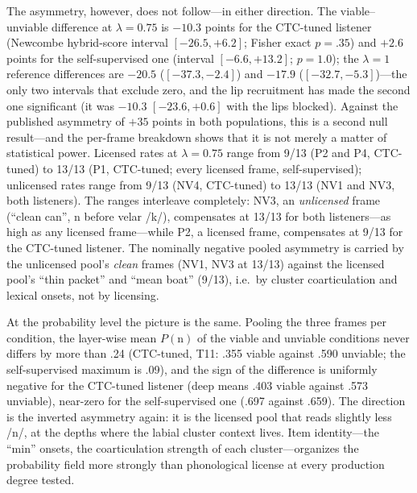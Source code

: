 \documentclass[11pt,a4paper]{article}
\newcommand{\lam}{\lambda}
\begin{document}
The asymmetry, however, does not follow---in either direction.
The viable--unviable difference at $\lam=0.75$ is $-10.3$ points for
the CTC-tuned listener (Newcombe hybrid-score interval $[-26.5,
+6.2]$; Fisher exact $p = .35$) and $+2.6$ points for the
self-supervised one (interval $[-6.6, +13.2]$; $p = 1.0$); the
$\lam=1$ reference differences are $-20.5$ ($[-37.3, -2.4]$) and
$-17.9$ ($[-32.7, -5.3]$)---the only two intervals that exclude
zero, and the lip recruitment has made the second one significant
(it was $-10.3$ $[-23.6, +0.6]$ with the lips blocked). Against
the published asymmetry of $+35$ points in both populations, this is
a second null result---and the per-frame breakdown shows that it is
not merely a matter of statistical power. Licensed rates at
$\lam=0.75$ range from 9/13 (P2 and P4, CTC-tuned) to 13/13 (P1,
CTC-tuned; every licensed frame, self-supervised); unlicensed rates
range from 9/13 (NV4, CTC-tuned) to 13/13 (NV1 and NV3, both
listeners). The ranges interleave completely: NV3, an
\emph{unlicensed} frame (``clean can'', n before velar /k/),
compensates at 13/13 for both listeners---as high as any licensed
frame---while P2, a licensed frame, compensates at 9/13 for the
CTC-tuned listener. The nominally negative pooled asymmetry is
carried by the unlicensed pool's \emph{clean} frames (NV1, NV3 at
13/13) against the licensed pool's ``thin packet'' and ``mean boat''
(9/13), i.e.\ by cluster coarticulation and lexical onsets, not by
licensing.

At the probability level the picture is the same. Pooling the three
frames per condition, the layer-wise mean $P(\mathrm{n})$ of the viable
and unviable conditions never differs by more than .24 (CTC-tuned,
T11: .355 viable against .590 unviable; the self-supervised maximum
is .09), and the sign of the difference is uniformly negative for
the CTC-tuned listener (deep means .403 viable against .573
unviable), near-zero for the self-supervised one (.697 against
.659). The direction is the inverted asymmetry again: it is the
licensed pool that reads slightly less /n/, at the depths where the
labial cluster context lives. Item identity---the ``min'' onsets, the
coarticulation strength of each cluster---organizes the probability
field more strongly than phonological license at every production
degree tested.
\end{document}
